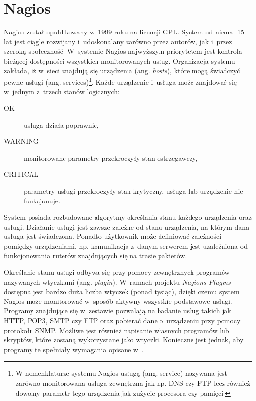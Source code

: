 \section[Nagios][Nagios]{Nagios}
\label{sec:Nagios}

Nagios\cite{www:Nagios} został opublikowany w~1999 roku na licencji GPL. System od
niemal 15 lat jest ciągle rozwijany i~udoskonalany zarówno przez
autorów, jak i~przez szeroką społeczność. W~systemie Nagios najwyższym
priorytetem jest kontrola bieżącej dostępności wszystkich
monitorowanych usług. Organizacja systemu zakłada, iż w~sieci znajdują
się urządzenia (ang. {\em hosts}), które mogą świadczyć pewne usługi
(ang. services)\footnote{W nomenklaturze systemu Nagios usługą
  (ang. service) nazywana jest zarówno monitorowana usługa zewnętrzna
  jak np. DNS czy FTP lecz również dowolny parametr tego urządzenia
  jak zużycie procesora czy pamięci.}. Każde urządzenie i~usługa może
  znajdować się w~jednym z~trzech stanów logicznych:

\begin{description}
\item[OK] usługa działa poprawnie,
\item[WARNING] monitorowane parametry przekroczyły stan ostrzegawczy,
\item[CRITICAL] parametry usługi przekroczyły stan krytyczny, usługa
  lub urządzenie nie funkcjonuje.
\end{description}

System posiada rozbudowane algorytmy określania stanu każdego
urządzenia oraz usługi. Działanie usługi jest zawsze zależne od stanu
urządzenia, na którym dana usługa jest świadczona. Ponadto użytkownik
może definiować zależności pomiędzy urządzeniami, np. komunikacja
z~danym serwerem jest uzależniona od funkcjonowania ruterów
znajdujących się na trasie pakietów.

Określanie stanu usługi odbywa się przy pomocy zewnętrznych programów
nazywanych wtyczkami (ang. {\em plugin}). W~ramach projektu {\em
  Nagions Plugins}\cite{www:NagiosPluginProject} dostępna jest bardzo
duża liczba wtyczek (ponad tysiąc), dzięki czemu system Nagios może
monitorować w~sposób aktywny wszystkie podstawowe usługi. Programy
znajdujące się w~zestawie pozwalają na badanie usług takich jak HTTP,
POP3, SMTP czy FTP oraz pobierać dane o~urządzeniu przy pomocy
protokołu SNMP. Możliwe jest również napisanie własnych programów lub
skryptów, które zostaną wykorzystane jako wtyczki. Konieczne jest
jednak, aby programy te spełniały wymagania opisane
w~\cite{www:NagiosPluginsTutorial}.

